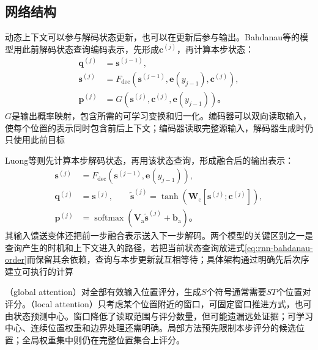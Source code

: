 \subsection{网络结构}
\label{sec:rnn-attentive-architecture}

动态上下文可以参与解码状态更新，也可以在更新后参与输出。Bahdanau等的模型用此前解码状态查询编码表示，先形成$\bm{c}^{(j)}$，再计算本步状态：
\begin{equation}
  \begin{aligned}
    \bm{q}^{(j)}&=\bm{s}^{(j-1)},\\
    \bm{s}^{(j)}&=F_{\mathrm{dec}}\!\left(
      \bm{s}^{(j-1)},\bm{e}(y_{j-1}),\bm{c}^{(j)}\right),\\
    \bm{p}^{(j)}&=G\!\left(\bm{s}^{(j)},\bm{c}^{(j)},\bm{e}(y_{j-1})\right)\text{。}
  \end{aligned}
  \label{eq:rnn-bahdanau-order}
\end{equation}
$G$是输出概率映射，包含所需的可学习变换和归一化。编码器可以双向读取输入，使每个位置的表示同时包含前后上下文；编码器读取完整源输入，解码器生成时仍只使用此前目标

Luong等则先计算本步解码状态，再用该状态查询，形成融合后的输出表示：
\begin{equation}
  \begin{aligned}
    \bm{s}^{(j)}&=F_{\mathrm{dec}}\!\left(
      \bm{s}^{(j-1)},\bm{e}(y_{j-1})\right),\\
    \bm{q}^{(j)}&=\bm{s}^{(j)},\qquad
    \widetilde{\bm{s}}^{(j)}=
       \tanh\!\left(\bm{W}_{\mathrm{c}}[\bm{s}^{(j)};\bm{c}^{(j)}]\right),\\
    \bm{p}^{(j)}&=\operatorname{softmax}\!\left(
      \bm{V}_{\mathrm{a}}\widetilde{\bm{s}}^{(j)}+\bm{b}_{\mathrm{a}}\right)\text{。}
  \end{aligned}
  \label{eq:rnn-luong-order}
\end{equation}
其输入馈送变体还把前一步融合表示送入下一步解码。两个模型的关键区别之一是查询产生的时机和上下文进入的路径，若把当前状态查询放进式\eqref{eq:rnn-bahdanau-order}而保留其余依赖，查询与本步更新就互相等待；具体架构通过明确先后次序建立可执行的计算

（global attention）对全部有效输入位置评分，生成$S$个符号通常需要$ST$个位置对评分。（local attention）只考虑某个位置附近的窗口，可固定窗口推进方式，也可由状态预测中心。窗口降低了读取范围与评分数量，但可能遗漏远处证据；可学习中心、连续位置权重和边界处理还需明确。局部方法预先限制本步评分的候选位置；全局权重集中则仍在完整位置集合上评分。

